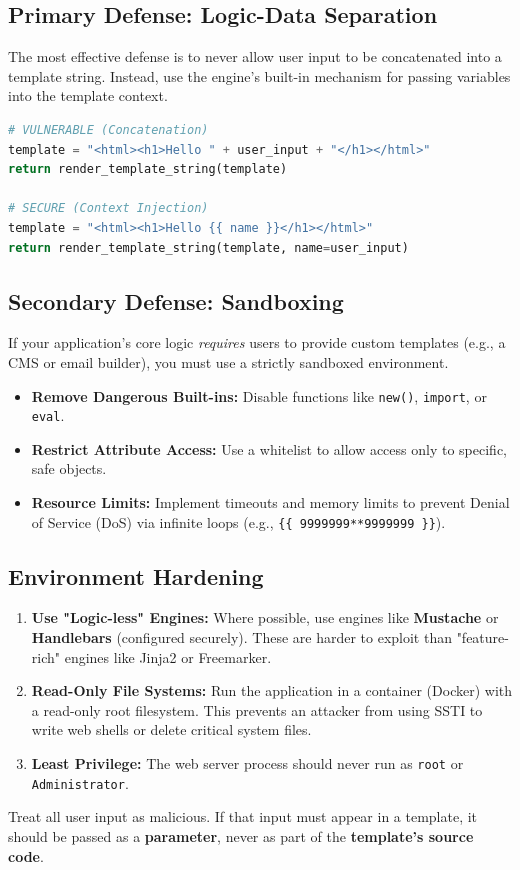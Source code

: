 \documentclass{article}
\begin{document}
\subsection{Primary Defense: Logic-Data Separation}
The most effective defense is to never allow user input to be concatenated into a template string. Instead, use the engine's built-in mechanism for passing variables into the template context.

\begin{lstlisting}[language=Python, caption=Secure vs Vulnerable Implementation]
# VULNERABLE (Concatenation)
template = "<html><h1>Hello " + user_input + "</h1></html>"
return render_template_string(template)

# SECURE (Context Injection)
template = "<html><h1>Hello {{ name }}</h1></html>"
return render_template_string(template, name=user_input)
\end{lstlisting}

\subsection{Secondary Defense: Sandboxing}
If your application's core logic \textit{requires} users to provide custom templates (e.g., a CMS or email builder), you must use a strictly sandboxed environment.

\begin{itemize}
    \item \textbf{Remove Dangerous Built-ins:} Disable functions like \texttt{new()}, \texttt{import}, or \texttt{eval}.
    \item \textbf{Restrict Attribute Access:} Use a whitelist to allow access only to specific, safe objects.
    \item \textbf{Resource Limits:} Implement timeouts and memory limits to prevent Denial of Service (DoS) via infinite loops (e.g., \texttt{\{\{ 9999999**9999999 \}\}}).
\end{itemize}

\subsection{Environment Hardening}


\begin{enumerate}
    \item \textbf{Use "Logic-less" Engines:} Where possible, use engines like \textbf{Mustache} or \textbf{Handlebars} (configured securely). These are harder to exploit than "feature-rich" engines like Jinja2 or Freemarker.
    \item \textbf{Read-Only File Systems:} Run the application in a container (Docker) with a read-only root filesystem. This prevents an attacker from using SSTI to write web shells or delete critical system files.
    \item \textbf{Least Privilege:} The web server process should never run as \texttt{root} or \texttt{Administrator}.
\end{enumerate}



\begin{infobox}
Treat all user input as malicious. If that input must appear in a template, it should be passed as a \textbf{parameter}, never as part of the \textbf{template's source code}.
\end{infobox}
\end{document}
